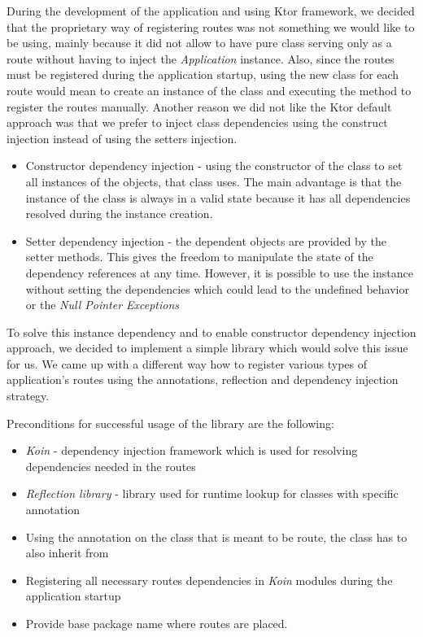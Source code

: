 During the development of the application and using Ktor framework, 
we decided that the proprietary way of registering routes was not something we would like to be using,
mainly because it did not allow to have pure class serving only as a route without having to inject the \textit{Application} instance.
Also, 
since the routes must be registered during the application startup,
using the new class for each route would mean to create an instance of the class and executing the method to register the routes manually.
Another reason we did not like the Ktor default approach was 
that we prefer to inject class dependencies using the construct injection instead of using the setters injection.
\begin{itemize}
    \item Constructor dependency injection - using the constructor of the class to set all instances of the objects, that class uses.
          The main advantage is that the instance of the class is always in a valid state because it has all dependencies resolved during the instance creation.
    \item Setter dependency injection - the dependent objects are provided by the setter methods.
          This gives the freedom to manipulate the state of the dependency references at any time.
          However, it is possible to use the instance without setting the dependencies which could lead to the undefined behavior or the \textit{Null Pointer Exceptions}
\end{itemize}

To solve this  instance dependency and to enable constructor dependency injection approach,
we decided to implement a simple library which would solve this issue for us.
We came up with a different way how to register various types of application's routes using the annotations, 
reflection and dependency injection strategy.

\medskip \noindent
Preconditions for successful usage of the library are the following:
\begin{itemize}
    \item \textit{Koin}\cite{koinGithub} - dependency injection framework which is used for resolving dependencies needed in the routes
    \item \textit{Reflection library}\cite{reflectionsGithub} - library used for runtime lookup for classes with specific annotation
    \item Using the  annotation on the class that is meant to be route,
    the class has to also inherit from 
    \item Registering all necessary routes dependencies in \textit{Koin} modules during the application startup
    \item Provide base package name where routes are placed.
\end{itemize}

